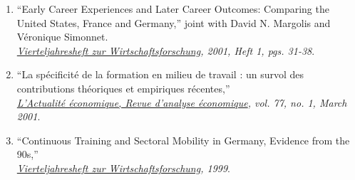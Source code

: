 \documentclass[10pt,letterpaper]{report}
\begin{document}
\begin{enumerate}
\item ``Early Career Experiences and Later Career Outcomes: Comparing the
United States, France and Germany,'' joint with David N. Margolis and
V\'eronique Simonnet.\\
{\it \href{http://www.diw.de/english/publikationen/vierteljahrshefte/jahrgang01/index.html}{Vierteljahresheft zur Wirtschaftsforschung}, 2001, Heft 1, pgs. 31-38}.%
\item ``La sp\'ecificit\'e de la formation en milieu de travail : un survol des
contributions th\'eoriques et empiriques r\'ecentes,'' \\
{\it \href{http://www.hec.ca/iea/actueco/}{L'Actualit\'e  \'economique, Revue  d'analyse \'economique}, vol. 77, no. 1, March 2001}.%
\item  ``Continuous Training and Sectoral Mobility in Germany, Evidence
  from the 90s,''\\
 {\it \href{http://www.diw.de/english/publikationen/vierteljahrshefte/jahrgang99/index.html}{Vierteljahresheft zur Wirtschaftsforschung}, 1999}.%
\end{enumerate}

\end{document}
